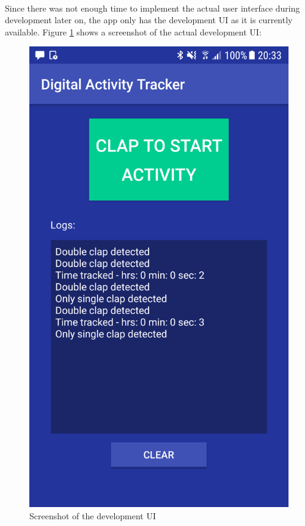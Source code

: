 \\
Since there was not enough time to implement the actual user interface during development later on, the app only has the development UI as it is currently available. Figure \ref{ui-screenshot} shows a screenshot of the actual development UI:
\begin{figure}[H]
	\centering
	\includegraphics[width=0.5\linewidth]{./imgs/uiScreenshot.png}
	\caption[Caption for LOF]{Screenshot of the development UI}
	\label{ui-screenshot}
\end{figure}